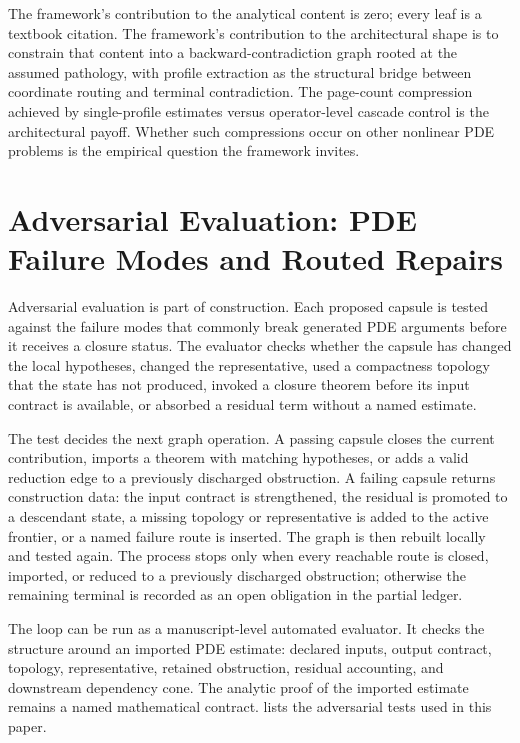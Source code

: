 \documentclass[11pt]{article}
\theoremstyle{plain}
\theoremstyle{definition}
\theoremstyle{remark}
\begin{document}
The framework's contribution to the analytical content is zero; every leaf is a
textbook citation. The framework's contribution to the architectural shape is to
constrain that content into a backward-contradiction graph rooted at the assumed
pathology, with profile extraction as the structural bridge between coordinate
routing and terminal contradiction. The page-count compression achieved by
single-profile estimates versus operator-level cascade control is the
architectural payoff. Whether such compressions occur on other nonlinear PDE
problems is the empirical question the framework invites.

\section{Adversarial Evaluation: PDE Failure Modes and Routed Repairs}
\label{sec:pde-hallucinations}

Adversarial evaluation is part of construction.  Each proposed capsule is
tested against the failure modes that commonly break generated PDE arguments
before it receives a closure status.  The evaluator checks whether the capsule
has changed the local hypotheses, changed the representative, used a
compactness topology that the state has not produced, invoked a closure theorem
before its input contract is available, or absorbed a residual term without a
named estimate.

The test decides the next graph operation.  A passing capsule closes the
current contribution, imports a theorem with matching hypotheses, or adds a
valid reduction edge to a previously discharged obstruction.  A failing capsule
returns construction data: the input contract is strengthened, the residual is
promoted to a descendant state, a missing topology or representative
is added to the active frontier, or a named failure route is inserted.  The
graph is then rebuilt locally and tested again.  The process stops only when
every reachable route is closed, imported, or reduced to a previously
discharged obstruction; otherwise the remaining terminal is recorded as an open
obligation in the partial ledger.

The loop can be run as a manuscript-level automated evaluator.  It checks the
structure around an imported PDE estimate: declared inputs, output contract,
topology, representative, retained obstruction, residual accounting,
and downstream dependency cone.  The analytic proof of the imported estimate
remains a named mathematical contract.
 lists the adversarial tests used in
this paper.
\end{document}
